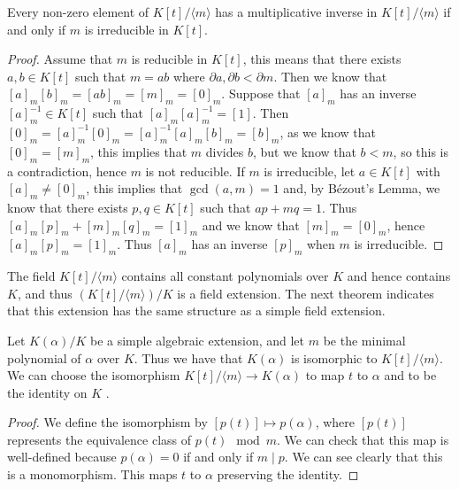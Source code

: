 \begin{theorem} \label{thm:irreducible-mod-field}
	Every non-zero element of $K[t] /\langle m\rangle$ has a multiplicative inverse in $K[t] /\langle m\rangle$ if and only if $m$ is irreducible in $K[t]$.
\end{theorem}

\begin{proof}
	Assume that \(m\) is reducible in \(K[t]\), this means that there exists \(a,b \in K[t]\) such that \(m = ab\) where \(\partial a,\partial b < \partial m\). Then we know that \([a]_m[b]_m = [ab]_m = [m]_m = [0]_m\). Suppose that \([a]_m\) has an inverse \([a]_m^{-1} \in K[t]\) such that \([a]_m[a]_m^{-1} = [1]\). Then \([0]_m = [a]_m^{-1}[0]_m = [a]_m^{-1}[a]_m[b]_m = [b]_m\), as we know that \([0]_m = [m]_m\), this implies that \(m\) divides \(b\), but we know that \(b < m\), so this is a contradiction, hence \(m\) is not reducible. 
	If \(m\) is irreducible, let \(a \in K[t]\) with \([a]_m \neq [0]_m\), this implies that \(\gcd(a,m)=1\) and, by Bézout's Lemma, we know that there exists \(p,q \in K[t]\) such that \(ap + mq = 1\). Thus \([a]_m[p]_m + [m]_m[q]_m = [1]_m\) and we know that \([m]_m = [0]_m\), hence \([a]_m[p]_m = [1]_m\). Thus \([a]_m\) has an inverse \([p]_m\) when \(m\) is irreducible.
\end{proof}

The field $K[t] / \langle m \rangle$ contains all constant polynomials over $K$ and hence contains $K$, and thus $\left(K[t] / \langle m \rangle \right) / K$ is a field extension. The next theorem indicates that this extension has the same structure as a simple field extension.

\begin{theorem}
 Let $K(\alpha) / K$ be a simple algebraic extension, and let \(m\) be the minimal polynomial of \(\alpha\) over \(K\). Thus we have that $K(\alpha)$ is isomorphic to $K[t] /\langle m\rangle$. We can choose the isomorphism $K[t] /\langle m\rangle \rightarrow K(\alpha)$ to map $t$ to $\alpha$ and to be the identity on $K$ \cite{Stewart}.
\end{theorem}

\begin{proof}
We define the isomorphism by $[p(t)] \mapsto p(\alpha)$, where $[p(t)]$ represents the equivalence class of $p(t)\mod m$. We can check that this map is well-defined because $p(\alpha)=0$ if and only if $m \mid p$. We can see clearly that this is a monomorphism. This maps \(t\) to \(\alpha\) preserving the identity.
\end{proof}

